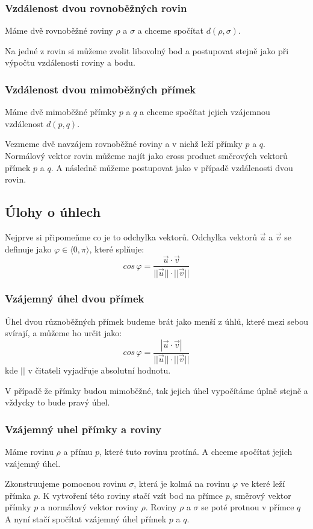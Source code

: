 \subsubsection{Vzdálenost dvou rovnoběžných rovin}
Máme dvě rovnoběžné roviny $\rho$ a $\sigma$ a chceme spočítat
$d(\rho, \sigma)$.

Na jedné z rovin si můžeme zvolit libovolný bod a postupovat
stejně jako při výpočtu vzdálenosti roviny a bodu.

\subsubsection{Vzdálenost dvou mimoběžných přímek}
Máme dvě mimoběžné přímky $p$ a $q$ a chceme spočítat jejich
vzájemnou vzdálenost $d(p, q)$.

Vezmeme dvě navzájem rovnoběžné roviny a v nichž leží přímky $p$ a $q$.
Normálový vektor rovin můžeme najít jako cross product směrových vektorů
přímek $p$ a $q$. A následně můžeme postupovat jako v případě vzdálenosti dvou
rovin.

\subsection{Úlohy o úhlech}
Nejprve si připomeňme co je to odchylka vektorů.
Odchylka vektorů $\vec{u}$ a $\vec{v}$ se definuje jako
$\varphi \in \langle 0, \pi \rangle$, které splňuje:
$$cos\,\varphi = \frac{\vec{u} \cdot
\vec{v}}{||\vec{u}|| \cdot ||\vec{v}||}$$

\subsubsection{Vzájemný úhel dvou přímek}
Úhel dvou různoběžných přímek budeme brát jako
menší z úhlů, které mezi sebou svírají, a můžeme ho určit jako:
$$cos\,\varphi = \frac{|\vec{u} \cdot \vec{v}|}{||\vec{u}|| \cdot ||\vec{v}||}$$
kde $||$ v čitateli vyjadřuje absolutní hodnotu.

V případě že přímky budou mimoběžné, tak jejich úhel vypočítáme
úplně stejně a vždycky to bude pravý úhel.

\subsubsection{Vzájemný uhel přímky a roviny}
Máme rovinu $\rho$ a přímu $p$, které tuto rovinu protíná.
A chceme spočítat jejich vzájemný úhel.

Zkonstruujeme pomocnou rovinu $\sigma$, která je kolmá na rovinu
$\varphi$ ve které leží přímka $p$. K vytvoření této roviny stačí vzít bod
na přímce $p$, směrový vektor přímky $p$ a normálový vektor roviny $\rho$.
Roviny $\rho$ a $\sigma$ se poté protnou v přímce $q$
A nyní stačí spočítat vzájemný úhel přímek $p$ a $q$.


